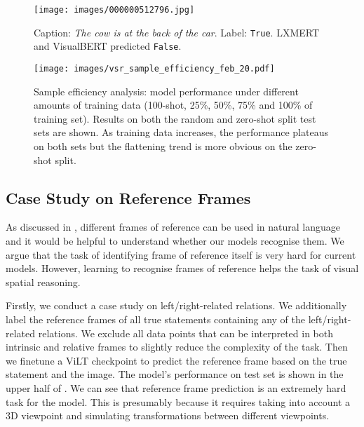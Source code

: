 \begin{figure}[!tbp]
  \centering
    \texttt{[image: images/000000512796.jpg]}
    \caption{Caption: \textit{The cow is at the back of the car}. Label: \texttt{True}. LXMERT and VisualBERT predicted \texttt{False}.}
    \label{fig:cow_back_car}
\end{figure}





\begin{figure*}[!thp]
    \centering
    \texttt{[image: images/vsr\_sample\_efficiency\_feb\_20.pdf]}
\caption{Sample efficiency analysis: model performance under different amounts of training data (100-shot, 25\%, 50\%, 75\% and 100\% of training set). Results on both the random and zero-shot split test sets are shown. As training data increases, the performance plateaus on both sets but the flattening trend is more obvious on the zero-shot split.}
    \label{fig:sample_efficiency}
\end{figure*}

\subsection{Case Study on Reference Frames}\label{sec:exp_rf}

As discussed in , different frames of reference can be used in natural language and it would be helpful to understand whether our models recognise them.
We argue that the task of identifying frame of reference itself is very hard for current models. However, learning to recognise frames of reference helps the task of visual spatial reasoning.

Firstly, we conduct a case study on left/right-related relations. We additionally label the reference frames of all true statements containing any of the left/right-related relations. We exclude all data points that can be interpreted in both intrinsic and relative frames to slightly reduce the complexity of the task.
Then we finetune a ViLT checkpoint to predict the reference frame based on the true statement and the image. The model's performance on test set is shown in the upper half of . We can see that reference frame prediction is an extremely hard task for the model. This is presumably because it requires taking into account a 3D viewpoint and simulating transformations between different viewpoints.

